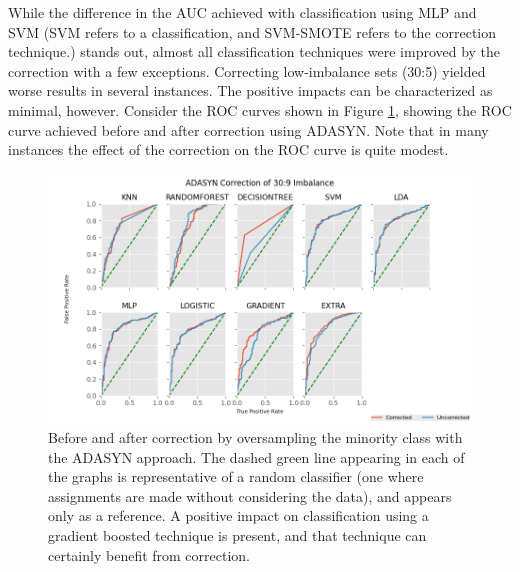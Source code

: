 \documentclass[letterpaper, notitlepage]{report}
\begin{document}
While the difference in the AUC achieved with classification using MLP and SVM (SVM refers to a classification, and SVM-SMOTE refers to the correction technique.) stands out, almost all classification techniques were improved by the correction with a few exceptions. Correcting low-imbalance sets (30:5) yielded worse results in several instances. The positive impacts can be characterized as minimal, however. Consider the ROC curves shown in Figure \ref{fig:auc}, showing the ROC curve achieved before and after correction using ADASYN. Note that in many instances the effect of the correction on the ROC curve is quite modest.

\begin{figure}[!htb]
	\centering
	\includegraphics[height=0.40\textheight]{figures/roc-corrected.png}
	\caption[Before and after correction]{Before and after correction by oversampling the minority class with the ADASYN approach. The dashed green line appearing in each of the graphs is representative of a random classifier (one where assignments are made without considering the data), and appears only as a reference. A positive impact on classification using a gradient boosted technique is present, and that technique can certainly benefit from correction. }
	\label{fig:auc}
\end{figure}
\end{document}
